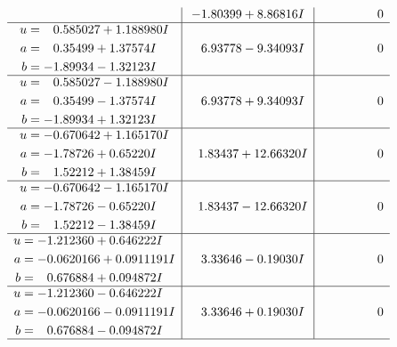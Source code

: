 \documentclass[1p]{elsarticle_modified}
\theoremstyle{definition}
\begin{document}
$$\begin{array}{c|c|c}
 & -1.80399 + 8.86816 I & \phantom{-0.000000 } 0 \\ \hline\begin{aligned}
u &= \phantom{-}0.585027 + 1.188980 I \\
a &= \phantom{-}0.35499 + 1.37574 I \\
b &= -1.89934 - 1.32123 I\end{aligned}
 & \phantom{-}6.93778 - 9.34093 I & \phantom{-0.000000 } 0 \\ \hline\begin{aligned}
u &= \phantom{-}0.585027 - 1.188980 I \\
a &= \phantom{-}0.35499 - 1.37574 I \\
b &= -1.89934 + 1.32123 I\end{aligned}
 & \phantom{-}6.93778 + 9.34093 I & \phantom{-0.000000 } 0 \\ \hline\begin{aligned}
u &= -0.670642 + 1.165170 I \\
a &= -1.78726 + 0.65220 I \\
b &= \phantom{-}1.52212 + 1.38459 I\end{aligned}
 & \phantom{-}1.83437 + 12.66320 I & \phantom{-0.000000 } 0 \\ \hline\begin{aligned}
u &= -0.670642 - 1.165170 I \\
a &= -1.78726 - 0.65220 I \\
b &= \phantom{-}1.52212 - 1.38459 I\end{aligned}
 & \phantom{-}1.83437 - 12.66320 I & \phantom{-0.000000 } 0 \\ \hline\begin{aligned}
u &= -1.212360 + 0.646222 I \\
a &= -0.0620166 + 0.0911191 I \\
b &= \phantom{-}0.676884 + 0.094872 I\end{aligned}
 & \phantom{-}3.33646 - 0.19030 I & \phantom{-0.000000 } 0 \\ \hline\begin{aligned}
u &= -1.212360 - 0.646222 I \\
a &= -0.0620166 - 0.0911191 I \\
b &= \phantom{-}0.676884 - 0.094872 I\end{aligned}
 & \phantom{-}3.33646 + 0.19030 I & \phantom{-0.000000 } 0\\
 \hline 
 \end{array}$$\newpage$$\begin{array}{c|c|c}  

\end{array}$$
\end{document}
